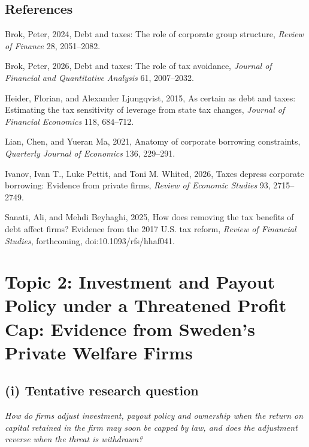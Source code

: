 \documentclass[12pt,a4paper]{article}
\newenvironment{refs}{\begin{list}{}{\setlength{\leftmargin}{1.5em}\setlength{\itemindent}{-1.5em}\setlength{\itemsep}{1pt}}}{\end{list}}
\begin{document}
\subsection*{References}
\begin{refs}
\item Brok, Peter, 2024, Debt and taxes: The role of corporate group structure, \emph{Review of Finance} 28, 2051--2082.
\item Brok, Peter, 2026, Debt and taxes: The role of tax avoidance, \emph{Journal of Financial and Quantitative Analysis} 61, 2007--2032.
\item Heider, Florian, and Alexander Ljungqvist, 2015, As certain as debt and taxes: Estimating the tax sensitivity of leverage from state tax changes, \emph{Journal of Financial Economics} 118, 684--712.
\item Lian, Chen, and Yueran Ma, 2021, Anatomy of corporate borrowing constraints, \emph{Quarterly Journal of Economics} 136, 229--291.
\item Ivanov, Ivan T., Luke Pettit, and Toni M. Whited, 2026, Taxes depress corporate borrowing: Evidence from private firms, \emph{Review of Economic Studies} 93, 2715--2749.
\item Sanati, Ali, and Mehdi Beyhaghi, 2025, How does removing the tax benefits of debt affect firms? Evidence from the 2017 U.S. tax reform, \emph{Review of Financial Studies}, forthcoming, doi:10.1093/rfs/hhaf041.
\end{refs}

\newpage

\section{Topic 2: Investment and Payout Policy under a Threatened Profit Cap: Evidence from Sweden's Private Welfare Firms}

\subsection{(i) Tentative research question}

\emph{How do firms adjust investment, payout policy and ownership when the return on capital retained in the firm may soon be capped by law, and does the adjustment reverse when the threat is withdrawn?}
\end{document}
